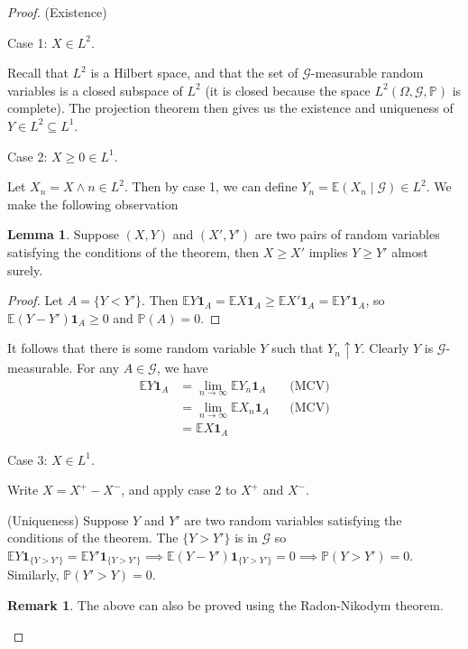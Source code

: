 \documentclass[parskip=full]{article}
\theoremstyle{definition}
\newtheorem{lemma}{Lemma}[proposition]
\newtheorem*{remark}{Remark}
\newcommand{\Pbb}{\mathbb{P}}
\newcommand{\1}{\mathbbm{1}}
\newcommand{\E}{\mathbb{E}}
\begin{document}
\begin{proof}(Existence)

  Case 1: $X \in L^2$.

  Recall that $L^2$ is a Hilbert space, and that the set of $\mathcal{G}$-measurable random variables is a closed subspace of $L^2$ (it is closed because the space $L^2(\Omega, \mathcal{G}, \Pbb)$ is complete). The projection theorem then gives us the existence and uniqueness of $Y\in L^2 \subseteq L^1$.

  Case 2: $X \geq 0 \in L^1$.

  Let $X_n = X \wedge n \in L^2$. Then by case 1, we can define $Y_n = \E(X_n \mid \mathcal{G}) \in L^2$. We make the following observation

  \begin{lemma}
    Suppose $(X, Y)$ and $(X', Y')$ are two pairs of random variables satisfying the conditions of the theorem, then $X \geq X'$ implies $Y \geq Y'$ almost surely.
  \end{lemma}

  \begin{proof}
    Let $A = \{Y < Y'\}$. Then $\E Y \mathbf{1}_A = \E X \mathbf{1}_A \geq \E X' \mathbf{1}_A = \E Y' \mathbf{1}_A$, so $\E (Y - Y') \mathbf{1}_A \geq 0$ and $\Pbb(A) = 0$.
  \end{proof}

  It follows that there is some random variable $Y$ such that $Y_n \uparrow Y$. Clearly $Y$ is $\mathcal{G}$-measurable. For any $A \in \mathcal{G}$, we have
  \begin{align*}
    \E Y \mathbf{1}_A & = \lim_{n \to \infty} \E Y_n \mathbf{1}_A &   & \text{(MCV)} \\
                      & = \lim_{n \to \infty} \E X_n \mathbf{1}_A &   & \text{(MCV)} \\
    &= \E X \mathbf{1}_A
  \end{align*}

  Case 3: $X \in L^1$.

  Write $X = X^+ - X^-$, and apply case 2 to $X^+$ and $X^-$.

  (Uniqueness)
  Suppose $Y$ and $Y'$ are two random variables satisfying the conditions of the theorem. The $\{Y > Y'\}$ is in $\mathcal{G}$ so $\E Y \mathbf{1}_{\{Y > Y'\}} = \E Y' \mathbf{1}_{\{Y > Y'\}} \implies \E (Y - Y') \mathbf{1}_{\{Y > Y'\}} = 0 \implies \Pbb(Y > Y') = 0$. Similarly, $\Pbb(Y' > Y) = 0$.


  \begin{remark}
    The above can also be proved using the Radon-Nikodym theorem.
  \end{remark}


\end{proof}
\end{document}
